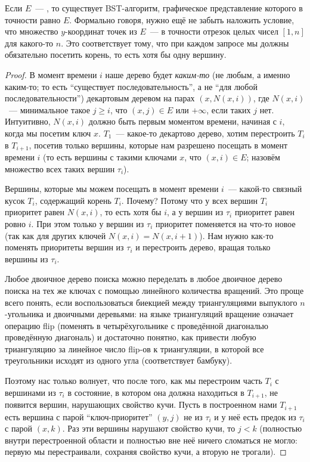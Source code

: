 \begin{theorem} Если $E$~--- \arbs, то существует BST-алгоритм, графическое представление
которого в точности равно $E$. Формально говоря, нужно ещё не забыть наложить
условие, что множество $y$-координат точек из $E$~--- в точности отрезок целых чисел $[1, n]$ для какого-то $n$. Это соответствует тому, что при каждом запросе мы должны обязательно посетить корень, то есть хотя бы одну вершину.
\end{theorem}
\begin{proof} В момент времени $i$ наше дерево будет \emph{каким-то} (не любым, а именно каким-то; то есть ``существует последовательность'', а не ``для любой последовательности'') декартовым деревом на парах $(x, N(x, i))$, где $N(x, i)$~--- минимальное такое $j \geqslant i$, что $(x, j) \in E$ или $+\infty$, если таких $j$ нет. Интуитивно, $N(x, i)$ должно быть первым моментом времени, начиная с $i$, когда мы посетим ключ $x$. $T_1$~--- какое-то декартово дерево, хотим перестроить $T_i$ в $T_{i+1}$, посетив только вершины, которые нам разрешено посещать в момент времени $i$
(то есть вершины с такими ключами $x$, что $(x, i) \in E$; назовём множество всех таких вершин $\tau_i$).

Вершины, которые мы можем посещать в момент времени $i$~--- какой-то связный кусок $T_i$, содержащий корень $T_i$. Почему? Потому что у всех вершин $T_i$ приоритет равен $N(x, i)$, то есть хотя бы $i$, а у вершин из $\tau_i$ приоритет равен ровно $i$. При этом только
у вершин из $\tau_i$ приоритет поменяется на что-то новое (так как для других ключей $N(x, i) = N(x, i + 1)$). Нам нужно как-то поменять приоритеты вершин из $\tau_i$ и перестроить дерево, вращая только вершины из $\tau_i$. 

Любое двоичное дерево поиска можно переделать в любое двоичное дерево поиска на тех же ключах с помощью линейного количества вращений. Это проще всего понять, если воспользоваться биекцией между триангуляциями выпуклого $n$-угольника и двоичными деревьями: на языке триангуляций вращение означает операцию \textrm{flip} (поменять в четырёхугольнике с проведённой диагональю проведённую диагональ) и достаточно понятно, как привести любую триангуляцию за линейное число \textrm{flip}-ов к триангуляции, в которой
все треугольники исходят из одного угла (соответствует бамбуку). 

Поэтому нас только волнует, что после того, как мы перестроим часть $T_i$ с вершинами из $\tau_i$ в состояние, в котором она должна находиться в $T_{i+1}$, не появится вершин, нарушающих свойство кучи. Пусть в построенном нами $T_{i+1}$ есть вершина с парой ``ключ-приоритет'' $(y, j)$ не из $\tau_i$ и у неё есть предок из $\tau_i$ с парой $(x, k)$. Раз эти вершины нарушают свойство кучи, то $j < k$ (полностью внутри перестроенной области и полностью вне неё ничего сломаться не могло: первую мы перестраивали, сохраняя свойство кучи, а вторую не трогали).


\end{proof}
